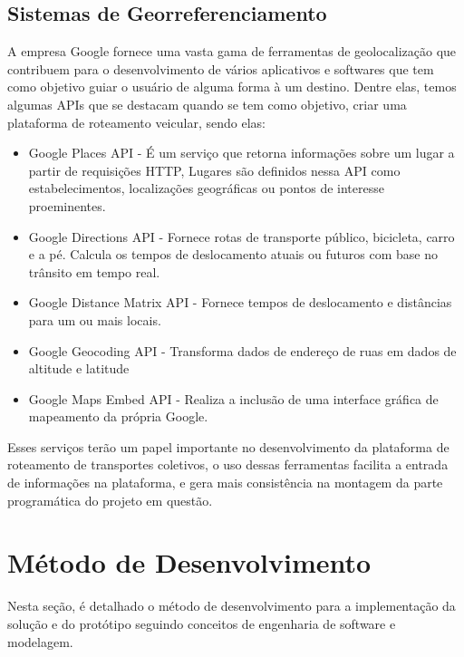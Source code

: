 \subsection{Sistemas de Georreferenciamento}\label{georreferenciamento}
A empresa Google fornece uma vasta gama de ferramentas de geolocalização que contribuem para o desenvolvimento de vários aplicativos e softwares que tem como objetivo guiar o usuário de alguma forma à um destino. Dentre elas, temos algumas APIs que se destacam quando se tem como objetivo, criar uma plataforma de roteamento veicular, sendo elas:
\begin{itemize}
    \item Google Places API - É um serviço que retorna informações sobre um lugar a partir de requisições HTTP, Lugares são definidos nessa API como estabelecimentos, localizações geográficas ou pontos de interesse proeminentes.
    
    \item Google Directions API - Fornece rotas de transporte público, bicicleta, carro e a pé. Calcula os tempos de deslocamento atuais ou futuros com base no trânsito em tempo real.
    
    \item Google Distance Matrix API - Fornece tempos de deslocamento e distâncias para um ou mais locais.
    
    \item Google Geocoding API - Transforma dados de endereço de ruas em dados de altitude e latitude
    
    \item Google Maps Embed API - Realiza a inclusão de uma interface gráfica de mapeamento da própria Google.

\end{itemize}

Esses serviços terão um papel importante no desenvolvimento da plataforma de roteamento de transportes coletivos, o uso dessas ferramentas facilita a entrada de informações na plataforma, e gera mais consistência na montagem da parte programática do projeto em questão.

\section{Método de Desenvolvimento}
\label{metodo-desenvolvimento}
Nesta seção, é detalhado o método de desenvolvimento para a implementação da solução e do protótipo seguindo conceitos de engenharia de software e modelagem.

